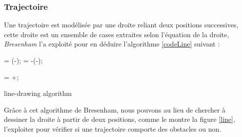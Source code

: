 \subsubsection{Trajectoire}
Une trajectoire est modélisée par une droite reliant deux positions successives, cette droite est un ensemble de cases extraites selon l'équation de la droite, \textit{Bresenham} \cite{line} l'a exploité pour en déduire l'algorithme \ref{codeLine} suivant : 




\noindent
\begin{minipage}[t]{0.45\textwidth}
	\vspace{-0.5cm}
	\begin{algorithm}[H]
		
		\SetAlgoLined
		\DontPrintSemicolon
		
		
		
		\dx = \Abs(\xx-\x);
		\dy = -\Abs(\yy-\y);
		
		
		\err = \dx+\dy;
		
		\caption{line-drawing algorithm \cite{line}}
		\label{codeLine}
	\end{algorithm}
\end{minipage}\hfill
\begin{minipage}[t]{0.45\textwidth}
	\centering{}
	\captionsetup{width=0.7\linewidth}
	\label{line}
\end{minipage}

\vspace{0.5cm}
Grâce à cet algorithme de Bresenham, nous pouvons au lieu de chercher à dessiner la droite à partir de deux positions, comme le montre la figure \ref{line}, l'exploiter pour vérifier si une trajectoire comporte des obstacles ou non.




